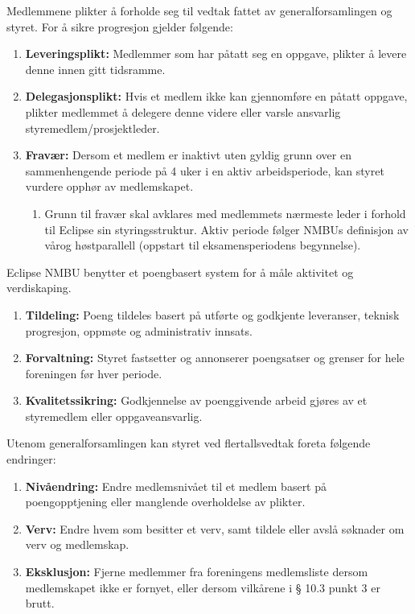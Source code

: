 \documentclass{rapport}
\begin{document}
Medlemmene plikter å forholde seg til vedtak fattet av generalforsamlingen og styret. For å
sikre progresjon gjelder følgende:
\begin{enumerate}
  \item \textbf{Leveringsplikt:} Medlemmer som har påtatt seg en oppgave, plikter å levere denne
        innen gitt tidsramme.
  \item \textbf{Delegasjonsplikt:} Hvis et medlem ikke kan gjennomføre en påtatt oppgave, plikter
        medlemmet å delegere denne videre eller varsle ansvarlig
        styremedlem/prosjektleder.
  \item \textbf{Fravær:} Dersom et medlem er inaktivt uten gyldig grunn over en sammenhengende
        periode på 4 uker i en aktiv arbeidsperiode, kan styret vurdere opphør av
        medlemskapet.
        \begin{enumerate}[label=\alph*.]
          \item Grunn til fravær skal avklares med medlemmets nærmeste leder i forhold til
                Eclipse sin styringsstruktur. Aktiv periode følger NMBUs definisjon av vårog
                høstparallell (oppstart til eksamensperiodens begynnelse).
        \end{enumerate}
\end{enumerate}

Eclipse NMBU benytter et poengbasert system for å måle aktivitet og verdiskaping.
\begin{enumerate}
  \item \textbf{Tildeling:} Poeng tildeles basert på utførte og godkjente leveranser, teknisk
        progresjon, oppmøte og administrativ innsats.
  \item \textbf{Forvaltning:} Styret fastsetter og annonserer poengsatser og grenser for hele
        foreningen før hver periode.
  \item \textbf{Kvalitetssikring:} Godkjennelse av poenggivende arbeid gjøres av et styremedlem
        eller oppgaveansvarlig.
\end{enumerate}

Utenom generalforsamlingen kan styret ved flertallsvedtak foreta følgende endringer:
\begin{enumerate}
  \item \textbf{Nivåendring:} Endre medlemsnivået til et medlem basert på poengopptjening eller
        manglende overholdelse av plikter.
  \item \textbf{Verv:} Endre hvem som besitter et verv, samt tildele eller avslå søknader om verv og
        medlemskap.
  \item \textbf{Eksklusjon:} Fjerne medlemmer fra foreningens medlemsliste dersom medlemskapet
        ikke er fornyet, eller dersom vilkårene i § 10.3 punkt 3 er brutt.
\end{enumerate}
\end{document}
